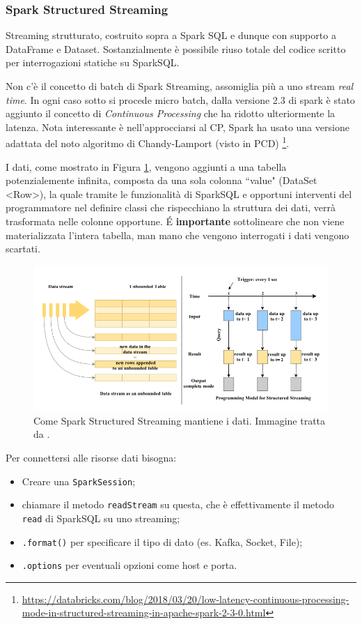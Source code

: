 \documentclass[12pt,italian]{article}
\begin{document}
\subsubsection{Spark Structured Streaming}\label{sec:structuredstreaming}
Streaming strutturato, costruito sopra a Spark SQL e dunque con supporto a DataFrame e Dataset. 
Sostanzialmente è possibile riuso totale del codice scritto per interrogazioni statiche su SparkSQL.
\par Non c'è il concetto di batch di Spark Streaming, assomiglia più a uno stream \textit{real time}.
In ogni caso sotto si procede micro batch, dalla versione 2.3 di spark è stato aggiunto il concetto di \textit{Continuous Processing} che ha ridotto ulteriormente la latenza.
Nota interessante è nell'approcciarsi al CP, Spark ha usato una versione adattata del noto algoritmo di Chandy-Lamport (visto in PCD) \footnote{\url{https://databricks.com/blog/2018/03/20/low-latency-continuous-processing-mode-in-structured-streaming-in-apache-spark-2-3-0.html}}.
\par I dati, come mostrato in Figura \ref{fig:StructuredStreaming}, vengono aggiunti a una tabella potenzialemente infinita, composta da una sola colonna ``value" (DataSet \textless Row\textgreater ),  la quale tramite le funzionalità di SparkSQL e opportuni interventi del programmatore nel definire classi che rispecchiano la struttura dei dati, verrà trasformata nelle colonne opportune.
É \textbf{importante} sottolineare che non viene materializzata l'intera tabella, man mano che vengono interrogati i dati vengono scartati. 
\begin{figure}[H]
	\centering 
	\includegraphics[width=1\linewidth]{img/sparkStructuredStreaming.png}
	\caption{Come Spark Structured Streaming mantiene i dati. Immagine tratta da \cite{structuredStreaming}.}
	\label{fig:StructuredStreaming}
\end{figure}
Per connettersi alle risorse dati bisogna:
\begin{itemize}
	\item Creare una \texttt{SparkSession};
	\item chiamare il metodo \texttt{readStream} su questa, che è effettivamente il metodo \texttt{read} di SparkSQL su uno streaming;
	\item \texttt{.format()} per specificare il tipo di dato (es. Kafka, Socket, File);
	\item \texttt{.options} per eventuali opzioni come host e porta.
\end{itemize}
\end{document}
